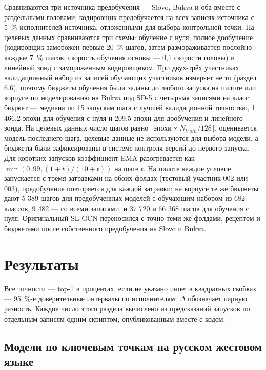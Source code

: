 \documentclass[a4paper,fleqn]{cas-dc}
\begin{document}
Сравниваются три источника предобучения --- Slovo, Bukva и оба вместе с раздельными головами; кодировщик предобучается на всех записях источника с 5~\% исполнителей источника, отложенными для выбора контрольной точки. На целевых данных сравниваются три схемы: обучение с нуля, полное дообучение (кодировщик заморожен первые 20~\% шагов, затем размораживается послойно каждые 7~\% шагов, скорость обучения основы --- 0,1 скорости головы) и линейный зонд с замороженным кодировщиком. При двух-трёх участниках валидационный набор из записей обучающих участников измеряет не то (раздел 6.6), поэтому бюджеты обучения были заданы до любого запуска на пилоте или корпусе по моделированию на Bukva под SD-5 с четырьмя записями на класс: бюджет --- медиана по 15 запускам шага с лучшей валидационной точностью, 1 466,2 эпохи для обучения с нуля и 209,5 эпохи для дообучения и линейного зонда. На целевых данных число шагов равно \(\lceil \text{эпохи} \times N_{train}/128 \rceil\), оценивается модель последнего шага, целевые данные не используются для выбора модели, а бюджеты были зафиксированы в системе контроля версий до первого запуска. Для коротких запусков коэффициент EMA разогревается как \(\min(0{,}99, (1+t)/(10+t))\) на шаге \(t\). На пилоте каждое условие запускается с тремя затравками на обоих фолдах (тестовый участник 002 или 003), предобучение повторяется для каждой затравки; на корпусе те же бюджеты дают 5 389 шагов для предобученных моделей с обучающим набором из 682 классов, 9 482 --- со всеми записями, и 37 720 и 66 368 шагов для обучения с нуля. Оригинальный SL-GCN переносился с точно теми же фолдами, рецептом и бюджетами после собственного предобучения на Slovo и Bukva.

\hypertarget{ux440ux435ux437ux443ux43bux44cux442ux430ux442ux44b}{%
\section{Результаты}\label{ux440ux435ux437ux443ux43bux44cux442ux430ux442ux44b}}

Все точности --- top-1 в процентах, если не указано иное; в квадратных скобках --- 95~\%-е доверительные интервалы по исполнителям; \(\Delta\) обозначает парную разность. Каждое число этого раздела вычислено из предсказаний запусков по отдельным записям одним скриптом, опубликованным вместе с кодом.

\hypertarget{ux43cux43eux434ux435ux43bux438-ux43fux43e-ux43aux43bux44eux447ux435ux432ux44bux43c-ux442ux43eux447ux43aux430ux43c-ux43dux430-ux440ux443ux441ux441ux43aux43eux43c-ux436ux435ux441ux442ux43eux432ux43eux43c-ux44fux437ux44bux43aux435}{%
\subsection{Модели по ключевым точкам на русском жестовом языке}\label{ux43cux43eux434ux435ux43bux438-ux43fux43e-ux43aux43bux44eux447ux435ux432ux44bux43c-ux442ux43eux447ux43aux430ux43c-ux43dux430-ux440ux443ux441ux441ux43aux43eux43c-ux436ux435ux441ux442ux43eux432ux43eux43c-ux44fux437ux44bux43aux435}}
\end{document}
